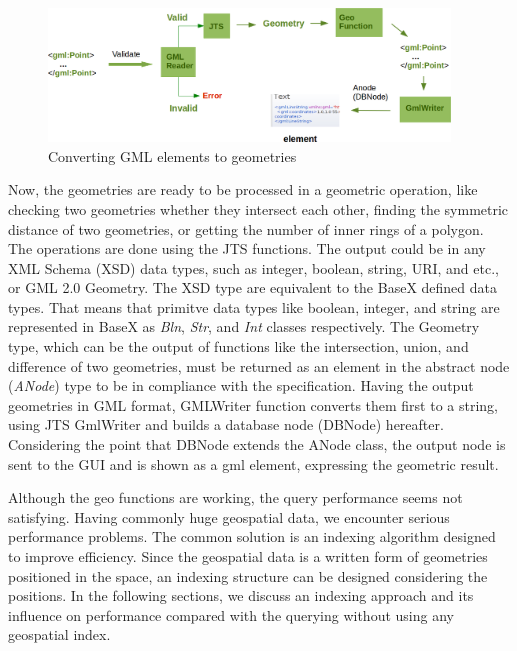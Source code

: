 \documentclass[a4paper,12pt]{article}
\begin{document}
 \begin{figure}
\centering
\includegraphics[width=0.95\textwidth]{GeoModuleProcess}
\caption{Converting GML elements to geometries}
\label{figGeoModuleProcess}
\end{figure}

Now, the geometries are ready to be processed in a geometric operation, like checking two geometries whether they intersect each other, finding the symmetric distance of two geometries, or getting the number of inner rings of a polygon. The operations are done using the JTS functions. The output could be in any XML Schema (XSD) data types, such as integer, boolean, string, URI, and etc., or GML 2.0 Geometry. The XSD type are equivalent to the BaseX defined data types. That means that primitve data types like boolean, integer, and string are represented in BaseX as \textit{Bln}, \textit{Str}, and \textit{Int} classes respectively. The Geometry type, which can be the output of functions like the intersection, union, and difference of two geometries, must be returned as an element in the abstract node (\textit{ANode}) type to be in compliance with the specification. Having the output geometries in GML format, GMLWriter function converts them first to a string, using JTS GmlWriter and builds a database node (DBNode) hereafter. Considering the point that DBNode extends the ANode class, the output node is sent to the GUI and is shown as a gml element, expressing the geometric result. 

Although the geo functions are working, the query performance seems not satisfying. Having commonly huge geospatial data, we encounter serious performance problems. The common solution is an indexing algorithm designed to improve efficiency. Since the geospatial data is a written form of geometries positioned in the space, an indexing structure can be designed considering the positions. In the following sections, we discuss an indexing approach and its influence on performance compared with the querying without using any geospatial index.
\end{document}
